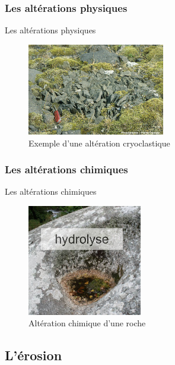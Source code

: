 \documentclass{beamer}
\begin{document}
\subsubsection{Les altérations physiques}
\begin{frame}{Les altérations physiques}
  \begin{center}
    \begin{figure}
      \includegraphics[width=6cm]{Images/Diapos/Alteration/Physique/cryoclastie.jpg}
      \caption{Exemple d'une altération cryoclastique}
    \end{figure}
  \end{center}
\end{frame}

\subsubsection{Les altérations chimiques}
\begin{frame}{Les altérations chimiques}
  \begin{center}
    \begin{figure}
      \includegraphics[width=5cm]{Images/Diapos/Alteration/Chimiques/hydrolyse.jpeg}
      \caption{Altération chimique d'une roche}
    \end{figure}
  \end{center}
\end{frame}

\subsection{L'érosion}
\end{document}
